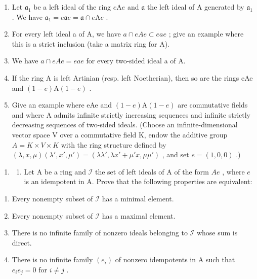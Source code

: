 \begin{enumerate}
\def\labelenumi{\alph{enumi})}
\item
  Let \(\mathfrak{a}_1\) be a left ideal of the ring \(e\mathrm{A}e\) and \(\mathfrak{a}\) the left ideal of A generated by \(\mathfrak{a}_1\) . We have \(\mathfrak{a}_1 = e\mathfrak{a}e = \mathfrak{a} \cap e\mathrm{A}e\) .
\item
  For every left ideal a of A, we have \(a \cap eAe \subset eae\) ; give an example where this is a strict inclusion (take a matrix ring for A).
\item
  We have \(a \cap eAe = eae\) for every two-sided ideal a of A.
\item
  If the ring A is left Artinian (resp. left Noetherian), then so are the rings eAe and \((1-e)\mathrm{A}(1-e)\) .
\item
  Give an example where eAe and \((1-e)\mathrm{A}(1-e)\) are commutative fields and where A admits infinite strictly increasing sequences and infinite strictly decreasing sequences of two-sided ideals. (Choose an infinite-dimensional vector space V over a commutative field K, endow the additive group \(A=K\times V\times K\) with the ring structure defined by \((\lambda,x,\mu)(\lambda',x',\mu')=(\lambda\lambda',\lambda x'+\mu'x,\mu\mu')\) , and set \(e=(1,0,0)\) .)
\end{enumerate}

\begin{enumerate}
\def\labelenumi{\arabic{enumi})}
\setcounter{enumi}{6}
\tightlist
\item
  \begin{enumerate}
  \def\labelenumii{\alph{enumii})}
  \tightlist
  \item
    Let A be a ring and \(\mathcal{I}\) the set of left ideals of A of the form \(Ae\) , where \(e\) is an idempotent in A. Prove that the following properties are equivalent:
  \end{enumerate}
\end{enumerate}

\begin{enumerate}
\def\labelenumi{(\roman{enumi})}
\item
  Every nonempty subset of \(\mathcal{I}\) has a minimal element.
\item
  Every nonempty subset of \(\mathcal{I}\) has a maximal element.
\item
  There is no infinite family of nonzero ideals belonging to \(\mathcal{I}\) whose sum is direct.
\item
  There is no infinite family \((e_i)\) of nonzero idempotents in A such that \(e_i e_j = 0\) for \(i \neq j\) .
\end{enumerate}

